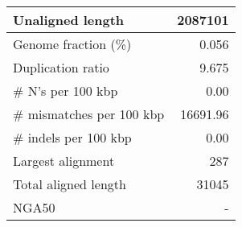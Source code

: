 \documentclass[12pt,a4paper]{article}
\begin{document}
\begin{table}[ht]
\begin{center}
\begin{tabular}{|l*{1}{|r}|}
Unaligned length & 2087101 \\ \hline
Genome fraction (\%) & 0.056 \\ \hline
Duplication ratio & 9.675 \\ \hline
\# N's per 100 kbp & 0.00 \\ \hline
\# mismatches per 100 kbp & 16691.96 \\ \hline
\# indels per 100 kbp & 0.00 \\ \hline
Largest alignment & 287 \\ \hline
Total aligned length & 31045 \\ \hline
NGA50 & - \\ \hline
\end{tabular}
\end{center}
\end{table}
\end{document}
